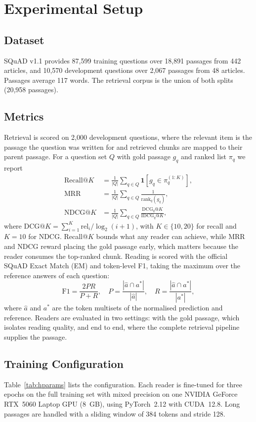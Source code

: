 \documentclass[conference]{IEEEtran}
\begin{document}
\section{Experimental Setup}

\subsection{Dataset}
SQuAD v1.1 \cite{rajpurkar2016} provides 87,599 training questions over 18,891 passages from
442 articles, and 10,570 development questions over 2,067 passages from 48 articles. Passages
average 117 words. The retrieval corpus is the union of both splits (20,958 passages).

\subsection{Metrics}
Retrieval is scored on 2,000 development questions, where the relevant item is the passage the
question was written for and retrieved chunks are mapped to their parent passage. For a
question set $Q$ with gold passage $g_q$ and ranked list $\pi_q$ we report
\begin{align}
\mathrm{Recall@}K &= \frac{1}{|Q|}\sum_{q\in Q}\mathbf{1}\!\left[g_q\in\pi_q^{(1:K)}\right],\\
\mathrm{MRR} &= \frac{1}{|Q|}\sum_{q\in Q}\frac{1}{\mathrm{rank}_q(g_q)},\\
\mathrm{NDCG@}K &= \frac{1}{|Q|}\sum_{q\in Q}\frac{\mathrm{DCG}_q@K}{\mathrm{IDCG}_q@K},
\end{align}
where $\mathrm{DCG@}K=\sum_{i=1}^{K}\mathrm{rel}_i/\log_2(i+1)$, with $K\in\{10,20\}$ for recall
and $K=10$ for NDCG. Recall@$K$ bounds what any reader can
achieve, while MRR and NDCG reward placing the gold passage early, which matters because the
reader consumes the top-ranked chunk. Reading is scored with the official SQuAD Exact Match (EM) and token-level F1, taking the maximum
over the reference answers of each question:
\begin{equation}
\mathrm{F1}=\frac{2PR}{P+R},\quad P=\frac{|\hat a\cap a^\ast|}{|\hat a|},\quad
R=\frac{|\hat a\cap a^\ast|}{|a^\ast|},
\end{equation}
where $\hat a$ and $a^\ast$ are the token multisets of the normalised prediction and reference.
Readers are evaluated in two settings: with the gold passage, which isolates reading quality,
and end to end, where the complete retrieval pipeline supplies the passage.

\subsection{Training Configuration}
Table~\ref{tab:hparams} lists the configuration. Each reader is fine-tuned for three epochs on
the full training set with mixed precision on one NVIDIA GeForce RTX~5060 Laptop GPU (8~GB),
using PyTorch~2.12 with CUDA~12.8. Long passages are handled with a sliding window of 384 tokens
and stride 128.
\end{document}
